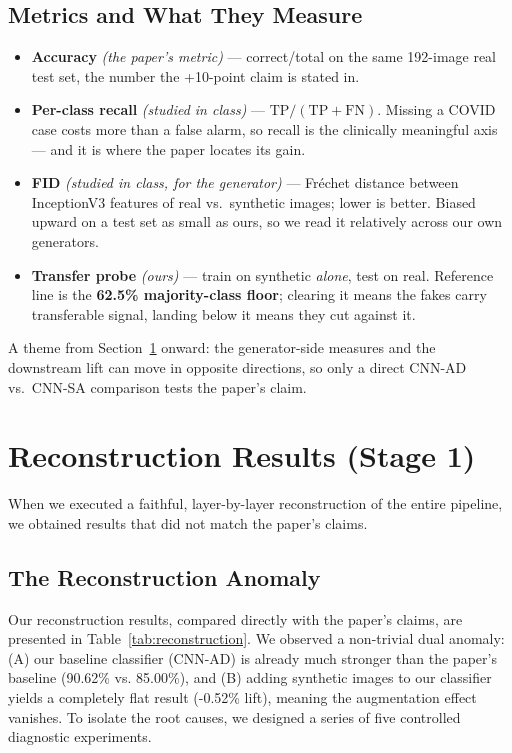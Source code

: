 \documentclass[11pt]{article}
\begin{document}
\subsection{Metrics and What They Measure}
\begin{itemize}[nosep, leftmargin=1.5em]
  \item \textbf{Accuracy} \emph{(the paper's metric)} --- correct/total on the same 192-image real test set, the number the +10-point claim is stated in.
  \item \textbf{Per-class recall} \emph{(studied in class)} --- $\mathrm{TP}/(\mathrm{TP}{+}\mathrm{FN})$. Missing a COVID case costs more than a false alarm, so recall is the clinically meaningful axis --- and it is where the paper locates its gain.
  \item \textbf{FID} \emph{(studied in class, for the generator)} --- Fr\'{e}chet distance between InceptionV3 features of real vs.\ synthetic images; lower is better. Biased upward on a test set as small as ours, so we read it relatively across our own generators.
  \item \textbf{Transfer probe} \emph{(ours)} --- train on synthetic \emph{alone}, test on real. Reference line is the \textbf{62.5\% majority-class floor}; clearing it means the fakes carry transferable signal, landing below it means they cut against it.
\end{itemize}

\noindent A theme from Section~\ref{sec:reconstruction_results} onward: the generator-side measures and the downstream lift can move in opposite directions, so only a direct CNN-AD vs.\ CNN-SA comparison tests the paper's claim.

\section{Reconstruction Results (Stage 1)} \label{sec:reconstruction_results}
When we executed a faithful, layer-by-layer reconstruction of the entire pipeline, we obtained results that did not match the paper's claims. 

\subsection{The Reconstruction Anomaly}
Our reconstruction results, compared directly with the paper's claims, are presented in Table~\ref{tab:reconstruction}. We observed a non-trivial dual anomaly: (A) our baseline classifier (CNN-AD) is already much stronger than the paper's baseline (90.62\% vs. 85.00\%), and (B) adding synthetic images to our classifier yields a completely flat result (-0.52\% lift), meaning the augmentation effect vanishes. To isolate the root causes, we designed a series of five controlled diagnostic experiments.
\end{document}
